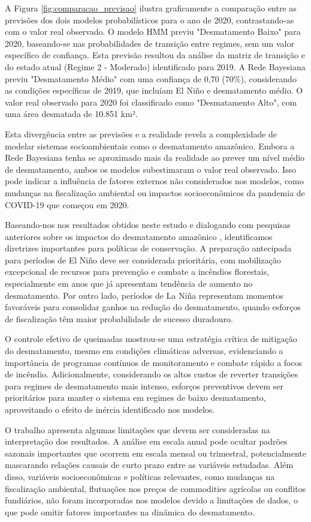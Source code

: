 \documentclass[12pt,a4paper]{article}
\begin{document}
A Figura \ref{fig:comparacao_previsao} ilustra graficamente a comparação entre as previsões dos dois modelos probabilísticos para o ano de 2020, contrastando-as com o valor real observado. O modelo HMM previu "Desmatamento Baixo" para 2020, baseando-se nas probabilidades de transição entre regimes, sem um valor específico de confiança. Esta previsão resultou da análise da matriz de transição e do estado atual (Regime 2 - Moderado) identificado para 2019. A Rede Bayesiana previu "Desmatamento Médio" com uma confiança de 0,70 (70\%), considerando as condições específicas de 2019, que incluíam El Niño e desmatamento médio. O valor real observado para 2020 foi classificado como "Desmatamento Alto", com uma área desmatada de 10.851 km².

Esta divergência entre as previsões e a realidade revela a complexidade de modelar sistemas socioambientais como o desmatamento amazônico. Embora a Rede Bayesiana tenha se aproximado mais da realidade ao prever um nível médio de desmatamento, ambos os modelos subestimaram o valor real observado. Isso pode indicar a influência de fatores externos não considerados nos modelos, como mudanças na fiscalização ambiental ou impactos socioeconômicos da pandemia de COVID-19 que começou em 2020.

Baseando-nos nos resultados obtidos neste estudo e dialogando com pesquisas anteriores sobre os impactos do desmatamento amazônico \citep{amazon}, identificamos diretrizes importantes para políticas de conservação. A preparação antecipada para períodos de El Niño deve ser considerada prioritária, com mobilização excepcional de recursos para prevenção e combate a incêndios florestais, especialmente em anos que já apresentam tendência de aumento no desmatamento. Por outro lado, períodos de La Niña representam momentos favoráveis para consolidar ganhos na redução do desmatamento, quando esforços de fiscalização têm maior probabilidade de sucesso duradouro.

O controle efetivo de queimadas mostrou-se uma estratégia crítica de mitigação do desmatamento, mesmo em condições climáticas adversas, evidenciando a importância de programas contínuos de monitoramento e combate rápido a focos de incêndio. Adicionalmente, considerando os altos custos de reverter transições para regimes de desmatamento mais intenso, esforços preventivos devem ser prioritários para manter o sistema em regimes de baixo desmatamento, aproveitando o efeito de inércia identificado nos modelos.

O trabalho apresenta algumas limitações que devem ser consideradas na interpretação dos resultados. A análise em escala anual pode ocultar padrões sazonais importantes que ocorrem em escala mensal ou trimestral, potencialmente mascarando relações causais de curto prazo entre as variáveis estudadas. Além disso, variáveis socioeconômicas e políticas relevantes, como mudanças na fiscalização ambiental, flutuações nos preços de commodities agrícolas ou conflitos fundiários, não foram incorporadas nos modelos devido a limitações de dados, o que pode omitir fatores importantes na dinâmica do desmatamento.
\end{document}
